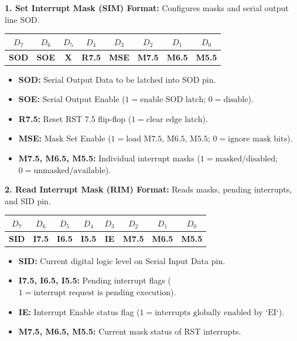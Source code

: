 \documentclass[12pt,a4paper]{article}
\begin{document}
\begin{tcolorbox}[formulabox, title={8085 SIM and RIM Instruction Bit Definitions}]
\textbf{1. Set Interrupt Mask (SIM) Format:} Configures masks and serial output line SOD.
\par\vspace{4pt}
\centering
\begin{tabular}{|c|c|c|c|c|c|c|c|}
\hline
$D_7$ & $D_6$ & $D_5$ & $D_4$ & $D_3$ & $D_2$ & $D_1$ & $D_0$ \\ \hline
\textbf{SOD} & \textbf{SOE} & \textbf{X} & \textbf{R7.5} & \textbf{MSE} & \textbf{M7.5} & \textbf{M6.5} & \textbf{M5.5} \\ \hline
\end{tabular}
\par\vspace{4pt}\raggedright
\begin{itemize}[leftmargin=*, itemsep=1pt]
  \item \textbf{SOD:} Serial Output Data to be latched into SOD pin.
  \item \textbf{SOE:} Serial Output Enable ($1 = \text{enable SOD latch}$; $0 = \text{disable}$).
  \item \textbf{R7.5:} Reset RST 7.5 flip-flop ($1 = \text{clear edge latch}$).
  \item \textbf{MSE:} Mask Set Enable ($1 = \text{load M7.5, M6.5, M5.5}$; $0 = \text{ignore mask bits}$).
  \item \textbf{M7.5, M6.5, M5.5:} Individual interrupt masks ($1 = \text{masked/disabled}$; $0 = \text{unmasked/available}$).
\end{itemize}
\par\vspace{6pt}
\textbf{2. Read Interrupt Mask (RIM) Format:} Reads masks, pending interrupts, and SID pin.
\par\vspace{4pt}
\centering
\begin{tabular}{|c|c|c|c|c|c|c|c|}
\hline
$D_7$ & $D_6$ & $D_5$ & $D_4$ & $D_3$ & $D_2$ & $D_1$ & $D_0$ \\ \hline
\textbf{SID} & \textbf{I7.5} & \textbf{I6.5} & \textbf{I5.5} & \textbf{IE} & \textbf{M7.5} & \textbf{M6.5} & \textbf{M5.5} \\ \hline
\end{tabular}
\par\vspace{4pt}\raggedright
\begin{itemize}[leftmargin=*, itemsep=1pt]
  \item \textbf{SID:} Current digital logic level on Serial Input Data pin.
  \item \textbf{I7.5, I6.5, I5.5:} Pending interrupt flags ($1 = \text{interrupt request is pending execution}$).
  \item \textbf{IE:} Interrupt Enable status flag ($1 = \text{interrupts globally enabled by `EI`}$).
  \item \textbf{M7.5, M6.5, M5.5:} Current mask status of RST interrupts.
\end{itemize}
\end{tcolorbox}
\end{document}
